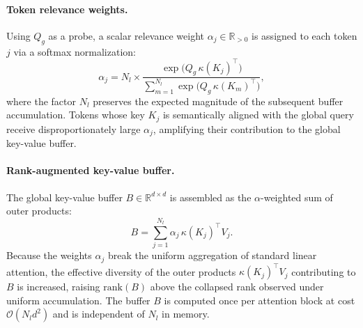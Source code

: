 \paragraph{Token relevance weights.}
Using $Q_g$ as a probe, a scalar relevance weight $\alpha_j \in \mathbb{R}_{>0}$
is assigned to each token $j$ via a softmax normalization:
\begin{equation}
\alpha_j = N_l \times
    \frac{\exp\!\bigl(Q_g\,\kappa(K_j)^\top\bigr)}
    {\displaystyle\sum_{m=1}^{N_l} \exp\!\bigl(Q_g\,\kappa(K_m)^\top\bigr)},
\label{eq:alpha_weights}
\end{equation}
where the factor $N_l$ preserves the expected magnitude of the subsequent
buffer accumulation. Tokens whose key $K_j$ is semantically aligned with the
global query receive disproportionately large $\alpha_j$, amplifying their
contribution to the global key-value buffer.

\paragraph{Rank-augmented key-value buffer.}
The global key-value buffer $B \in \mathbb{R}^{d \times d}$ is assembled as
the $\alpha$-weighted sum of outer products:
\begin{equation}
B = \sum_{j=1}^{N_l} \alpha_j\, \kappa(K_j)^\top V_j.
\label{eq:rala_buffer}
\end{equation}
Because the weights $\alpha_j$ break the uniform aggregation of standard
linear attention, the effective diversity of the outer products
$\kappa(K_j)^\top V_j$ contributing to $B$ is increased, raising
$\mathrm{rank}(B)$ above the collapsed rank observed under uniform
accumulation. The buffer $B$ is computed once per attention block at cost
$\mathcal{O}(N_l d^2)$ and is independent of $N_l$ in memory.


